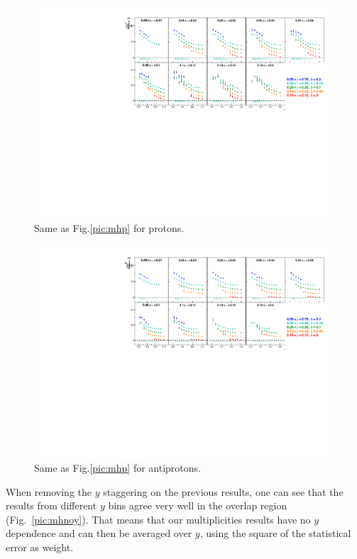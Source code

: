 \begin{figure}[!h]
  \centering
	\includegraphics[scale=0.85]{./gfx/pp.pdf}
	\caption{Same as Fig.\ref{pic:mhp} for protons.}
	\label{pic:mpp}
\end{figure}
\vfill
\newpage
\begin{figure}[!h]
  \centering
	\includegraphics[scale=0.85]{./gfx/pm.pdf}
	\caption{Same as Fig.\ref{pic:mhp} for antiprotons.}
	\label{pic:mpm}
\end{figure}

When removing the $y$ staggering on the previous results, one can see that the results from different $y$ bins agree very well in the overlap region (Fig.~\ref{pic:mhnoy}). That means that our multiplicities results have no $y$ dependence and can then be averaged over $y$, using the square of the statistical error as weight.

